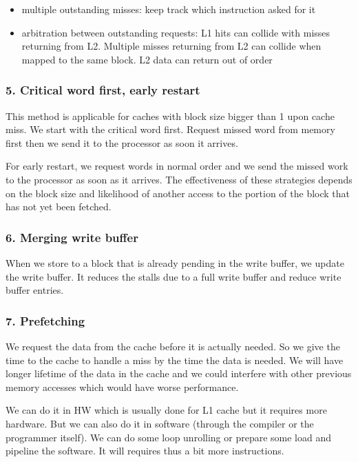 \documentclass{report}
\begin{document}
\begin{itemize}
    \item multiple outstanding misses: keep track which instruction asked for it
    \item arbitration between outstanding requests: L1 hits can collide with misses returning from L2. Multiple misses returning from L2 can collide when mapped to the same block. L2 data can return out of order
\end{itemize}

\subsubsection{5. Critical word first, early restart}

This method is applicable for caches with block size bigger than 1 upon cache miss. We start with the critical word first. Request missed word from memory first then we send it to the processor as soon it arrives.

For early restart,  we request words in normal order and we send the missed work to the processor as soon as it arrives. The effectiveness of these strategies depends on the block size and likelihood of another access to the portion of the block that has not yet been fetched.

\subsubsection{6. Merging write buffer}

When we store to a block that is already pending in the write buffer, we update the write buffer. It reduces the stalls due to a full write buffer and reduce write buffer entries.

\subsubsection{7. Prefetching}

We request the data from the cache before it is actually needed. So we give the time to the cache to handle a miss by the time the data is needed. We will have longer lifetime of the data in the cache and we could interfere with other previous memory accesses which would have worse performance.

We can do it in HW which is usually done for L1 cache but it requires more hardware. But we can also do it in software (through the compiler or the programmer itself). We can do some loop unrolling or prepare some load and pipeline the software. It will requires thus a bit more instructions.
\end{document}
